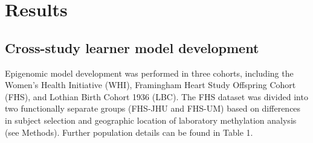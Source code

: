 \documentclass[]{article}
\begin{document}
\hypertarget{results}{%
\section{Results}\label{results}}

\hypertarget{cross-study-learner-model-development}{%
\subsection{Cross-study learner model
development}\label{cross-study-learner-model-development}}

Epigenomic model development was performed in three cohorts, including
the Women's Health Initiative (WHI), Framingham Heart Study Offspring
Cohort (FHS), and Lothian Birth Cohort 1936 (LBC). The FHS dataset was
divided into two functionally separate groups (FHS-JHU and FHS-UM) based
on differences in subject selection and geographic location of
laboratory methylation analysis (see Methods). Further population
details can be found in Table 1.
\end{document}
